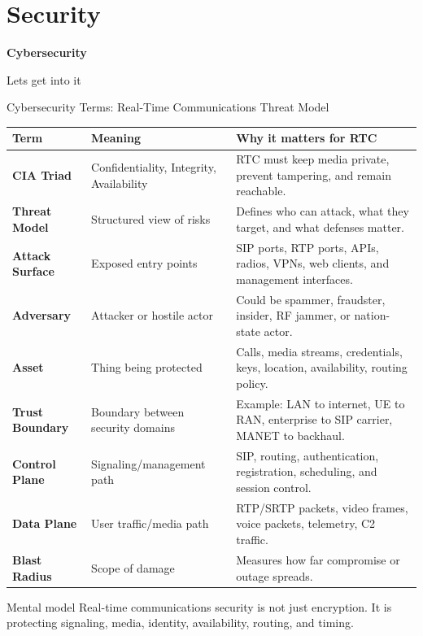 \documentclass[aspectratio=169]{beamer}
\begin{document}
\section{Security}

\begin{frame}
    \centering
    \vfill

    {\Huge \textbf{Cybersecurity}}

    \vspace{0.4cm}

    {\Large Lets get into it}

    \vfill
\end{frame}


\begin{frame}{Cybersecurity Terms: Real-Time Communications Threat Model}
\tiny
\begin{tabular}{p{2.2cm} p{3.5cm} p{6.5cm}}
\toprule
\textbf{Term} & \textbf{Meaning} & \textbf{Why it matters for RTC} \\
\midrule
\textbf{CIA Triad} & Confidentiality, Integrity, Availability & RTC must keep media private, prevent tampering, and remain reachable. \\
\textbf{Threat Model} & Structured view of risks & Defines who can attack, what they target, and what defenses matter. \\
\textbf{Attack Surface} & Exposed entry points & SIP ports, RTP ports, APIs, radios, VPNs, web clients, and management interfaces. \\
\textbf{Adversary} & Attacker or hostile actor & Could be spammer, fraudster, insider, RF jammer, or nation-state actor. \\
\textbf{Asset} & Thing being protected & Calls, media streams, credentials, keys, location, availability, routing policy. \\
\textbf{Trust Boundary} & Boundary between security domains & Example: LAN to internet, UE to RAN, enterprise to SIP carrier, MANET to backhaul. \\
\textbf{Control Plane} & Signaling/management path & SIP, routing, authentication, registration, scheduling, and session control. \\
\textbf{Data Plane} & User traffic/media path & RTP/SRTP packets, video frames, voice packets, telemetry, C2 traffic. \\
\textbf{Blast Radius} & Scope of damage & Measures how far compromise or outage spreads. \\
\bottomrule
\end{tabular}

\vspace{0.15cm}
\begin{block}{Mental model}
Real-time communications security is not just encryption. It is protecting signaling, media, identity, availability, routing, and timing.
\end{block}
\end{frame}
\end{document}

